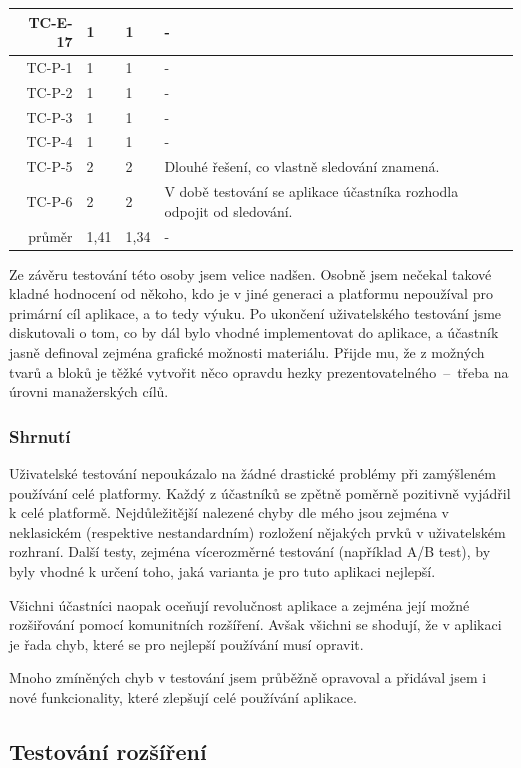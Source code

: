 \begin{longtable}{r|p{2cm}|p{2cm}|p{6cm}}
TC-E-17  & 1 & 1 & - \\\hline
TC-P-1   & 1 & 1 & - \\\hline
TC-P-2   & 1 & 1 & - \\\hline
TC-P-3   & 1 & 1 & - \\\hline
TC-P-4   & 1 & 1 & - \\\hline
TC-P-5   & 2 & 2 & Dlouhé řešení, co vlastně sledování znamená. \\\hline
TC-P-6   & 2 & 2 & V době testování se aplikace účastníka rozhodla odpojit od sledování. \\\hline\hline
průměr   & 1,41 & 1,34 & - \\
\end{longtable}

Ze závěru testování této osoby jsem velice nadšen.
Osobně jsem nečekal takové kladné hodnocení od někoho, kdo je v jiné generaci a platformu nepoužíval pro primární cíl aplikace, a to tedy výuku.
Po ukončení uživatelského testování jsme diskutovali o tom, co by dál bylo vhodné implementovat do aplikace, a účastník jasně definoval zejména grafické možnosti materiálu.
Přijde mu, že z možných tvarů a bloků je těžké vytvořit něco opravdu hezky prezentovatelného~--~třeba na úrovni manažerských cílů.

\subsubsection{Shrnutí}

Uživatelské testování nepoukázalo na žádné drastické problémy při zamýšleném používání celé platformy.
Každý z účastníků se zpětně poměrně pozitivně vyjádřil k celé platformě.
Nejdůležitější nalezené chyby dle mého jsou zejména v neklasickém (respektive nestandardním) rozložení nějakých prvků v uživatelském rozhraní.
Další testy, zejména vícerozměrné testování (například A/B test), by byly vhodné k určení toho, jaká varianta je pro tuto aplikaci nejlepší.

Všichni účastníci naopak oceňují revolučnost aplikace a zejména její možné rozšiřování pomocí komunitních rozšíření.
Avšak všichni se shodují, že v aplikaci je řada chyb, které se pro nejlepší používání musí opravit.

Mnoho zmíněných chyb v testování jsem průběžně opravoval a přidával jsem i nové funkcionality, které zlepšují celé používání aplikace. 

\subsection{Testování rozšíření}\label{text:testovani/rozsireni}

